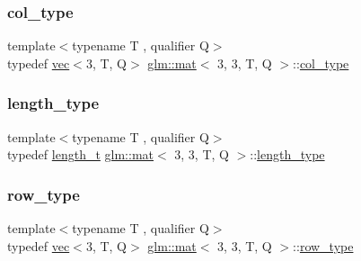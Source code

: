 \subsubsection{\texorpdfstring{col\+\_\+type}{col\_type}}
{\footnotesize\ttfamily template$<$typename T , qualifier Q$>$ \\
typedef \hyperlink{structglm_1_1vec}{vec}$<$3, T, Q$>$ \hyperlink{structglm_1_1mat}{glm\+::mat}$<$ 3, 3, T, Q $>$\+::\hyperlink{structglm_1_1mat_3_013_00_013_00_01_t_00_01_q_01_4_a4d84bef3685131dbb0ac43cac0a3b147}{col\+\_\+type}}

\mbox{\label{structglm_1_1mat_3_013_00_013_00_01_t_00_01_q_01_4_ae1b8524f20936516a48384a2841b5b9d}} 
\subsubsection{\texorpdfstring{length\+\_\+type}{length\_type}}
{\footnotesize\ttfamily template$<$typename T , qualifier Q$>$ \\
typedef \hyperlink{namespaceglm_a090a0de2260835bee80e71a702492ed9}{length\+\_\+t} \hyperlink{structglm_1_1mat}{glm\+::mat}$<$ 3, 3, T, Q $>$\+::\hyperlink{structglm_1_1mat_3_013_00_013_00_01_t_00_01_q_01_4_ae1b8524f20936516a48384a2841b5b9d}{length\+\_\+type}}

\mbox{\label{structglm_1_1mat_3_013_00_013_00_01_t_00_01_q_01_4_aa7593e64ea44bcccb91580e6f6a45110}} 
\subsubsection{\texorpdfstring{row\+\_\+type}{row\_type}}
{\footnotesize\ttfamily template$<$typename T , qualifier Q$>$ \\
typedef \hyperlink{structglm_1_1vec}{vec}$<$3, T, Q$>$ \hyperlink{structglm_1_1mat}{glm\+::mat}$<$ 3, 3, T, Q $>$\+::\hyperlink{structglm_1_1mat_3_013_00_013_00_01_t_00_01_q_01_4_aa7593e64ea44bcccb91580e6f6a45110}{row\+\_\+type}}

